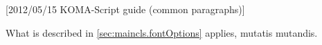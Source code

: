 %
%
%
%
%
%
%
%
% 
%
%
%
%

[2012/05/15 KOMA-Script guide (common paragraphs)]


\makeatletter
{}%
%
%
%
\makeatother


\label{sec:\csname label@base\endcsname.fontOptions}
\ifshortversion\IgnoreThisfalse{}\fi%
\ifIgnoreThis %
What is described in \autoref{sec:maincls.fontOptions} applies, mutatis mutandis.
\else %

